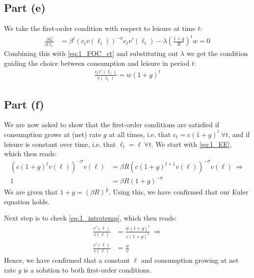 \documentclass{scrartcl}
\newcommand{\lep}{\left(}
\newcommand{\rip}{\right)}
\begin{document}
\subsection*{Part (e)}
We take the first-order condition with respect to leisure at time $t$: 
\begin{align}
	\frac{\partial \mathcal{L}}{\partial \ell_t} &= 
	\beta^t \lep c_tv(\ell_t) \rip^{-\sigma}c_t v'(\ell_t) - \lambda \lep \frac{1+g}{R}\rip^t w = 0 
\end{align}
Combining this with \eqref{eq:1_FOC_ct} and substituting out $\lambda$ we get the condition guiding the choice between consumption and leisure in period $t$: 
\begin{align} \label{eq:1_intratemp}
	\frac{c_t v'(\ell_t)}{v(\ell_t)} = w(1+g)^t
\end{align}

\subsection*{Part (f)}
We are now asked to show that the first-order conditions are satisfied if consumption grows at (net) rate $g$ at all times, i.e. that $c_t = c(1+g)^t ~ \forall t$, and if leisure is constant over time, i.e. that $\ell_t = \ell ~ \forall t$. We start with \eqref{eq:1_EE}, which then reads: 
\begin{align*} \label{eq:1_lookatgrowth}
	(c(1+g)^t v(\ell))^{-\sigma}v(\ell) &= \beta R (c(1+g)^{t+1}v(\ell))^{-\sigma}v(\ell) ~ \Rightarrow \\
		1 &= \beta R (1+g)^{-\sigma}
\end{align*}
We are given that $1+g = (\beta R)^{\frac{1}{\sigma}}$. Using this, we have confirmed that our Euler equation holds. 

Next step is to check \eqref{eq:1_intratemp}, which then reads: 
\begin{align}
	\frac{v'(\ell)}{v(\ell)} &= \frac{w(1+g)^t}{c(1+g)^t} ~ \Rightarrow \\
	\frac{v'(\ell)}{v(\ell)} &= \frac{w}{c} \label{eq:1_intratemp_constant}
\end{align}
Hence, we have confirmed that a constant $\ell$ and consumption growing at net rate $g$ is a solution to both first-order conditions. 
\end{document}
